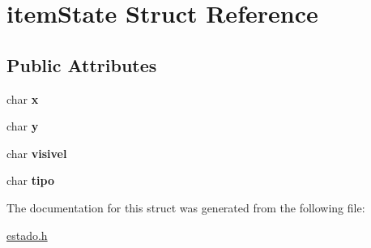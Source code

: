 \hypertarget{structitemState}{}\section{item\+State Struct Reference}
\label{structitemState}
\subsection*{Public Attributes}
\begin{DoxyCompactItemize}
\item 
char {\bfseries x}\hypertarget{structitemState_a8931ef2ebfbd4776990cf05caa547f0f}{}\label{structitemState_a8931ef2ebfbd4776990cf05caa547f0f}

\item 
char {\bfseries y}\hypertarget{structitemState_a1f160917dad98a620b0461d7e32f3398}{}\label{structitemState_a1f160917dad98a620b0461d7e32f3398}

\item 
char {\bfseries visivel}\hypertarget{structitemState_aeecadbd68c18971c6ea58544f47988d5}{}\label{structitemState_aeecadbd68c18971c6ea58544f47988d5}

\item 
char {\bfseries tipo}\hypertarget{structitemState_a9c43b34d0071d8d187d6f06c98e84654}{}\label{structitemState_a9c43b34d0071d8d187d6f06c98e84654}

\end{DoxyCompactItemize}


The documentation for this struct was generated from the following file\+:\begin{DoxyCompactItemize}
\item 
\hyperlink{estado_8h}{estado.\+h}\end{DoxyCompactItemize}

